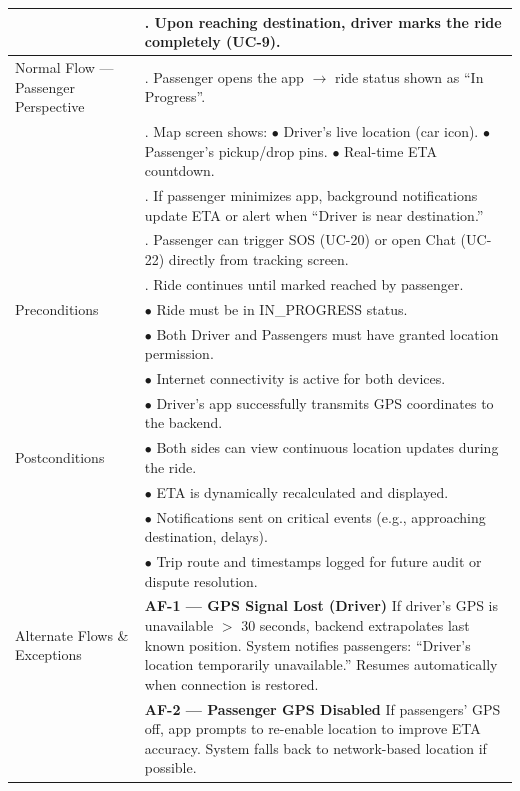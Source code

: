\begin{longtable}{|>{\raggedright\arraybackslash}p{4cm}|>{\raggedright\arraybackslash}p{11cm}|}
& 7. Upon reaching destination, driver marks the ride completely (UC-9). \\
\hline
Normal Flow — Passenger Perspective & 1. Passenger opens the app $\rightarrow$ ride status shown as “In Progress”. \\
& 2. Map screen shows: \newline $\bullet$ Driver’s live location (car icon). \newline $\bullet$ Passenger’s pickup/drop pins. \newline $\bullet$ Real-time ETA countdown. \\
& 3. If passenger minimizes app, background notifications update ETA or alert when “Driver is near destination.” \\
& 4. Passenger can trigger SOS (UC-20) or open Chat (UC-22) directly from tracking screen. \\
& 5. Ride continues until marked reached by passenger. \\
\hline
Preconditions & $\bullet$ Ride must be in IN\_PROGRESS status. \\
& $\bullet$ Both Driver and Passengers must have granted location permission. \\
& $\bullet$ Internet connectivity is active for both devices. \\
& $\bullet$ Driver’s app successfully transmits GPS coordinates to the backend. \\
\hline
Postconditions & $\bullet$ Both sides can view continuous location updates during the ride. \\
& $\bullet$ ETA is dynamically recalculated and displayed. \\
& $\bullet$ Notifications sent on critical events (e.g., approaching destination, delays). \\
& $\bullet$ Trip route and timestamps logged for future audit or dispute resolution. \\
\hline
Alternate Flows \& Exceptions & \textbf{AF-1 — GPS Signal Lost (Driver)} \newline If driver’s GPS is unavailable $>$ 30 seconds, backend extrapolates last known position. System notifies passengers: “Driver’s location temporarily unavailable.” Resumes automatically when connection is restored. \\
& \textbf{AF-2 — Passenger GPS Disabled} \newline If passengers’ GPS off, app prompts to re-enable location to improve ETA accuracy. System falls back to network-based location if possible. \\

\end{longtable}
